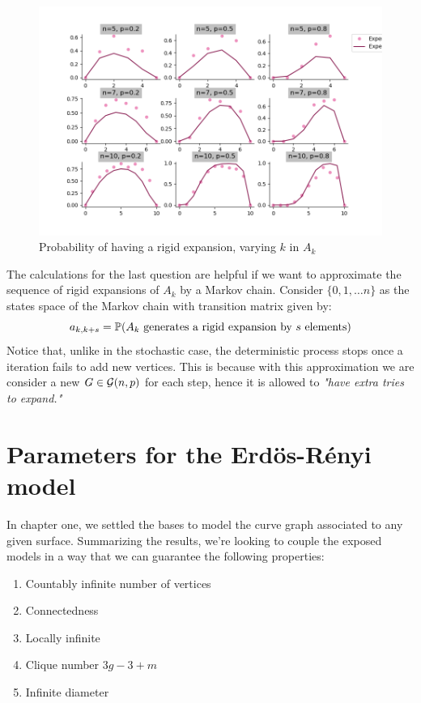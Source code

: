 \begin{figure}[h!]
	\centering
	\includegraphics[scale=0.5]{Python/Figures/Expansion-probability.png}
	\caption{Probability of having a rigid expansion,  varying $k$ in $A_k$}
\end{figure}

The calculations for the last question are helpful if we want to approximate the sequence of rigid expansions of $A_{k}$ by a Markov chain. Consider $\{0,1, \dots n\}$ as the states space of the Markov chain with transition matrix given by:
$$ a_{k,k+s} = \P(A_{k} \text{ generates a rigid expansion by } s \text{ elements})$$
Notice that, unlike in the stochastic case, the deterministic process stops once a iteration fails to add new vertices. This is because with this approximation we are consider a new $G \in \G(n,p)$ for each step, hence it is allowed to \textit{"have extra tries to expand."}


\section{Parameters for the Erdös-Rényi model}
In chapter one, we settled the bases to model the curve graph associated to any given surface. Summarizing the results, we're looking to couple the exposed models in a way that we can guarantee the following properties:

\begin{enumerate}
\item Countably infinite number of vertices
\item Connectedness
\item Locally infinite
\item Clique number $3g-3+m$
\item Infinite diameter
\end{enumerate}

